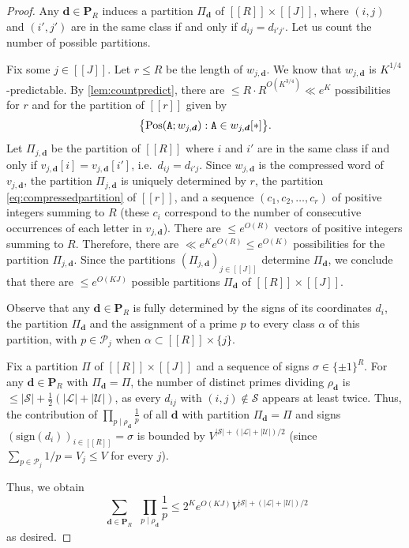\documentclass[11pt]{amsart}
\theoremstyle{definition}
\renewcommand{\leq}{\leqslant}
\newcommand{\sinterval}[1]{[\![#1]\!] }
\newcommand{\abs}[1]{\left|#1\right|}
\newcommand{\primes}{\mathcal{P}}
\renewcommand{\d}{\boldsymbol{d}}
\newcommand{\pcomp}[2]{d_{#1#2}}
\newcommand{\curlyL}{V}
\newcommand{\pred}{\mathbf{P}_{\!\tupsize}}
\newcommand{\upletters}[1]{{\normalfont{\texttt{#1}}}}
\newcommand{\fprod}[1]{\rho_{#1}}
\newcommand{\pall}{\fprod{\d}}
\newcommand{\letters}[1]{#1[*]}
\newcommand{\pos}[2]{\mathrm{Pos}(#2; #1)}
\newcommand{\lit}{\mathcal{L}}
\newcommand{\unlit}{\mathcal{U}}
\newcommand{\s}{\mathcal{S}}
\newcommand{\repR}{J}
\newcommand{\repK}{K}
\newcommand{\newR}{\sinterval{J}}
\newcommand{\tupsize}{R}
\newcommand{\somesigns}{\sigma}
\begin{document}
\begin{proof}
Any $\d\in \pred$ induces a partition $\Pi_{\d}$ of $\sinterval{\tupsize}\times \newR$, where $(i,j)$ and $(i',j')$ are in the same class if and only if $\pcomp{i}{j} = \pcomp{i'}{j'}$. Let us count the number of possible partitions.

Fix some $j\in \newR$. Let $r\leq \tupsize$ be the length of $w_{j,\d}$. We know that $w_{j,\d}$ is $\repK^{1/4}$-predictable. By \cref{lem:countpredict}, there are $\leq \tupsize \cdot \tupsize^{O(\repK^{3/4})} \ll e^{\repK}$ possibilities for $r$ and for the partition of $\sinterval{r}$ given by
 \begin{equation}
 \label{eq:compressedpartition}
 \big\{\pos{w_{j,\d}}{\upletters{A}} : \upletters{A} \in \letters{w_{j,\d}} \big\}.
 \end{equation}
Let $\Pi_{j,\d}$ be the partition of $\sinterval{\tupsize}$ where $i$ and $i'$ are in the same class if and only if $v_{j,\d}[i] = v_{j,\d}[i']$, i.e.~$\pcomp{i}{j} = \pcomp{i'}{j}$. Since $w_{j,\d}$ is the compressed word of $v_{j,\d}$, the partition $\Pi_{j,\d}$ is uniquely determined by $r$, the partition \cref{eq:compressedpartition} of $\sinterval{r}$, and a sequence $(c_1, c_2, \ldots, c_{r})$ of positive integers summing to $\tupsize$ (these $c_i$ correspond to the number of consecutive occurrences of each letter in $v_{j,\d}$). There are $\leq e^{O(\tupsize)}$ vectors of positive integers summing to $\tupsize$. Therefore, there are ${\ll e^{\repK} e^{O(\tupsize)} \leq e^{O(\repK)}}$ possibilities for the partition $\Pi_{j,\d}$. Since the partitions $(\Pi_{j,\d})_{j\in \newR}$ determine $\Pi_{\d}$, we conclude that there are $\leq e^{O(\repK\repR)}$ possible partitions $\Pi_{\d}$ of $\sinterval{\tupsize}\times \newR$. 

Observe that any $\d \in \pred$ is fully determined by the signs of its coordinates $d_i$, the partition $\Pi_{\d}$ and the assignment of a prime $p$ to every class $\alpha$ of this partition, with $p\in \primes_j$ when $\alpha\subset \sinterval{\tupsize}\times \{j\}$. 

Fix a partition $\Pi$ of $\sinterval{\tupsize}\times \newR$ and a sequence of signs $\somesigns\in \{\pm1\}^{\tupsize}$. For any $\d \in \pred$ with $\Pi_{\d} = \Pi$, the number of distinct primes dividing $\pall$ is $\leq |\s| + \tfrac{1}{2}(\abs{\lit}+\abs{\unlit})$, as every $\pcomp{i}{j}$ with $(i,j)\not\in \s$ appears at least twice. Thus, the contribution of $\prod_{p\mid \pall} \frac{1}{p}$ of all $\d$ with partition $\Pi_{\d} = \Pi$ and signs $(\mathrm{sign}(d_i))_{i\in \sinterval{\tupsize}} = \somesigns$ is bounded by $\curlyL^{|\s|+(\abs{\lit}+\abs{\unlit})/2}$ (since ${\sum_{p\in \primes_j}1/p = \curlyL_j\leq \curlyL}$ for every $j$). 

Thus, we obtain
\begin{equation*}
	\sum_{\substack{\d \in \pred}} \, \prod_{p\mid \pall} \frac{1}{p} \leq 2^{\repK} e^{O(\repK\repR)}\curlyL^{|\s|+(\abs{\lit}+\abs{\unlit})/2}
\end{equation*}
as desired.
\end{proof}
\end{document}
